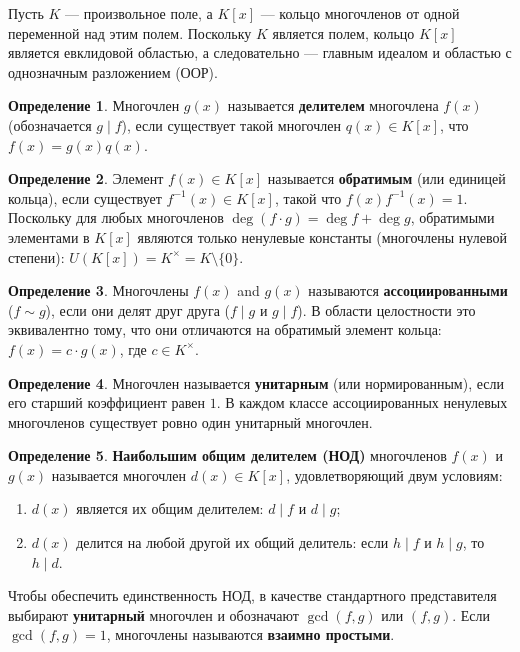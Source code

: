 \documentclass[12pt, a4paper]{article}
\theoremstyle{definition}
\newtheorem{definition}{Определение}
\theoremstyle{remark}
\begin{document}
Пусть $K$ — произвольное поле, а $K[x]$ — кольцо многочленов от одной переменной над этим полем. Поскольку $K$ является полем, кольцо $K[x]$ является евклидовой областью, а следовательно — главным идеалом и областью с однозначным разложением (ООР).

\begin{definition}
	Многочлен $g(x)$ называется \textbf{делителем} многочлена $f(x)$ (обозначается $g \mid f$), если существует такой многочлен $q(x) \in K[x]$, что $f(x) = g(x)q(x)$.
\end{definition}

\begin{definition}
	Элемент $f(x) \in K[x]$ называется \textbf{обратимым} (или единицей кольца), если существует $f^{-1}(x) \in K[x]$, такой что $f(x)f^{-1}(x) = 1$. Поскольку для любых многочленов $\deg(f \cdot g) = \deg f + \deg g$, обратимыми элементами в $K[x]$ являются только ненулевые константы (многочлены нулевой степени): $U(K[x]) = K^{\times} = K \setminus \{0\}$.
\end{definition}

\begin{definition}
	Многочлены $f(x)$ and $g(x)$ называются \textbf{ассоциированными} ($f \sim g$), если они делят друг друга ($f \mid g$ и $g \mid f$). В области целостности это эквивалентно тому, что они отличаются на обратимый элемент кольца: $f(x) = c \cdot g(x)$, где $c \in K^{\times}$.
\end{definition}

\begin{definition}
	Многочлен называется \textbf{унитарным} (или нормированным), если его старший коэффициент равен $1$. В каждом классе ассоциированных ненулевых многочленов существует ровно один унитарный многочлен.
\end{definition}

\begin{definition}
	\textbf{Наибольшим общим делителем (НОД)} многочленов $f(x)$ и $g(x)$ называется многочлен $d(x) \in K[x]$, удовлетворяющий двум условиям:
	\begin{enumerate}
		\item $d(x)$ является их общим делителем: $d \mid f$ и $d \mid g$;
		\item $d(x)$ делится на любой другой их общий делитель: если $h \mid f$ и $h \mid g$, то $h \mid d$.
	\end{enumerate}
	Чтобы обеспечить единственность НОД, в качестве стандартного представителя выбирают \textbf{унитарный} многочлен и обозначают $\gcd(f, g)$ или $(f, g)$. Если $\gcd(f, g) = 1$, многочлены называются \textbf{взаимно простыми}.
\end{definition}
\end{document}
